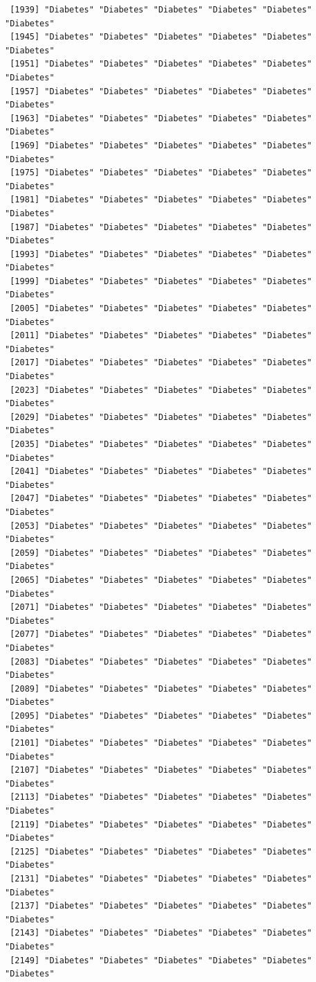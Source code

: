 \documentclass[
  letterpaper,
  DIV=11,
  numbers=noendperiod]{scrartcl}
\begin{document}
\begin{verbatim}
 [1939] "Diabetes" "Diabetes" "Diabetes" "Diabetes" "Diabetes" "Diabetes"
 [1945] "Diabetes" "Diabetes" "Diabetes" "Diabetes" "Diabetes" "Diabetes"
 [1951] "Diabetes" "Diabetes" "Diabetes" "Diabetes" "Diabetes" "Diabetes"
 [1957] "Diabetes" "Diabetes" "Diabetes" "Diabetes" "Diabetes" "Diabetes"
 [1963] "Diabetes" "Diabetes" "Diabetes" "Diabetes" "Diabetes" "Diabetes"
 [1969] "Diabetes" "Diabetes" "Diabetes" "Diabetes" "Diabetes" "Diabetes"
 [1975] "Diabetes" "Diabetes" "Diabetes" "Diabetes" "Diabetes" "Diabetes"
 [1981] "Diabetes" "Diabetes" "Diabetes" "Diabetes" "Diabetes" "Diabetes"
 [1987] "Diabetes" "Diabetes" "Diabetes" "Diabetes" "Diabetes" "Diabetes"
 [1993] "Diabetes" "Diabetes" "Diabetes" "Diabetes" "Diabetes" "Diabetes"
 [1999] "Diabetes" "Diabetes" "Diabetes" "Diabetes" "Diabetes" "Diabetes"
 [2005] "Diabetes" "Diabetes" "Diabetes" "Diabetes" "Diabetes" "Diabetes"
 [2011] "Diabetes" "Diabetes" "Diabetes" "Diabetes" "Diabetes" "Diabetes"
 [2017] "Diabetes" "Diabetes" "Diabetes" "Diabetes" "Diabetes" "Diabetes"
 [2023] "Diabetes" "Diabetes" "Diabetes" "Diabetes" "Diabetes" "Diabetes"
 [2029] "Diabetes" "Diabetes" "Diabetes" "Diabetes" "Diabetes" "Diabetes"
 [2035] "Diabetes" "Diabetes" "Diabetes" "Diabetes" "Diabetes" "Diabetes"
 [2041] "Diabetes" "Diabetes" "Diabetes" "Diabetes" "Diabetes" "Diabetes"
 [2047] "Diabetes" "Diabetes" "Diabetes" "Diabetes" "Diabetes" "Diabetes"
 [2053] "Diabetes" "Diabetes" "Diabetes" "Diabetes" "Diabetes" "Diabetes"
 [2059] "Diabetes" "Diabetes" "Diabetes" "Diabetes" "Diabetes" "Diabetes"
 [2065] "Diabetes" "Diabetes" "Diabetes" "Diabetes" "Diabetes" "Diabetes"
 [2071] "Diabetes" "Diabetes" "Diabetes" "Diabetes" "Diabetes" "Diabetes"
 [2077] "Diabetes" "Diabetes" "Diabetes" "Diabetes" "Diabetes" "Diabetes"
 [2083] "Diabetes" "Diabetes" "Diabetes" "Diabetes" "Diabetes" "Diabetes"
 [2089] "Diabetes" "Diabetes" "Diabetes" "Diabetes" "Diabetes" "Diabetes"
 [2095] "Diabetes" "Diabetes" "Diabetes" "Diabetes" "Diabetes" "Diabetes"
 [2101] "Diabetes" "Diabetes" "Diabetes" "Diabetes" "Diabetes" "Diabetes"
 [2107] "Diabetes" "Diabetes" "Diabetes" "Diabetes" "Diabetes" "Diabetes"
 [2113] "Diabetes" "Diabetes" "Diabetes" "Diabetes" "Diabetes" "Diabetes"
 [2119] "Diabetes" "Diabetes" "Diabetes" "Diabetes" "Diabetes" "Diabetes"
 [2125] "Diabetes" "Diabetes" "Diabetes" "Diabetes" "Diabetes" "Diabetes"
 [2131] "Diabetes" "Diabetes" "Diabetes" "Diabetes" "Diabetes" "Diabetes"
 [2137] "Diabetes" "Diabetes" "Diabetes" "Diabetes" "Diabetes" "Diabetes"
 [2143] "Diabetes" "Diabetes" "Diabetes" "Diabetes" "Diabetes" "Diabetes"
 [2149] "Diabetes" "Diabetes" "Diabetes" "Diabetes" "Diabetes" "Diabetes"

\end{verbatim}
\end{document}
